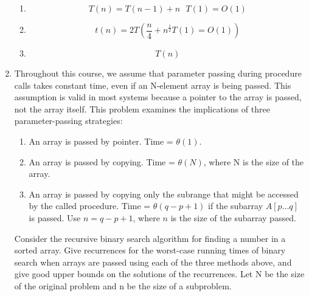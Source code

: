\documentclass[12pt]{report}
\newcommand{\choicelabel}{\alph*)}
\begin{document}
\begin{enumerate}[label=\arabic*.]
	\begin{enumerate}[label=\arabic{enumi}\choicelabel]
	    \item \[ T(n) = T(n-1) + n\mbox{  }T(1)=O(1) \]
		\item \[ t(n) = 2T\left( \frac{n}{4} + n^{\frac{1}{2}} T(1)=O(1)\right) \]
		\item \[ T(n) \]
	\end{enumerate}
	\item Throughout this course, we assume that parameter passing during procedure calls takes constant time, even if an N-element array is being passed. This assumption is valid in most systems because a pointer to the array is passed, not the array itself. This problem examines the implications of three parameter-passing strategies:
	\begin{enumerate}[label=\arabic*.]
	    \item An array is passed by pointer. Time = $\theta(1)$.
		\item An array is passed by copying. Time = $\theta(N)$, where N is the size of the array.
		\item An array is passed by copying only the subrange that might be accessed by the called procedure. Time = $\theta(q - p + 1)$ if the subarray $A[p \dots q]$ is passed. Use $n= q - p + 1$, where $n$ is the size of the subarray passed.
	\end{enumerate}
	Consider the recursive binary search algorithm for finding a number in a sorted array. Give recurrences for the worst-case running times of binary search when arrays are passed using each of the three methods above, and give good upper bounds on the solutions of the recurrences. Let N be the size of the original problem and n be the size of a subproblem.

\end{enumerate}
\end{document}
